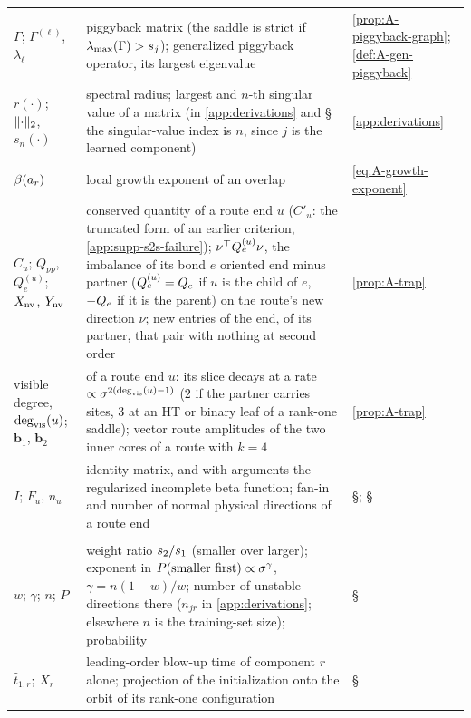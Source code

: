 \begin{xltabular}{\textwidth}{@{}>{\raggedright\arraybackslash}p{3.1cm}X
    >{\raggedright\arraybackslash}p{2.5cm}@{}}
  $\Gamma$; $\Gamma^{(\ell)}$, $\lambda_\ell$ & piggyback matrix (the saddle is strict if
    $\lambda_{\max}(\Gamma)>s_{j}$); generalized piggyback operator, its largest eigenvalue
    & \cref{prop:A-piggyback-graph}; \cref{def:A-gen-piggyback} \\
  $r(\cdot)$; $\lVert\cdot\rVert_2$, $s_n(\cdot)$ & spectral radius; largest and $n$-th singular value of a
    matrix (in \cref{app:derivations} and \S{} the singular-value index is
    $n$, since $j$ is the learned component) & \cref{app:derivations} \\
  $\beta(a_{r})$ & local growth exponent of an overlap & \eqref{eq:A-growth-exponent} \\
  $C_u$; $Q_{\nu\nu}$, $Q^{(u)}_e$; $X_{\rm nv}$, $Y_{\rm nv}$ & conserved quantity of a route end $u$
    ($C'_u$: the truncated form of an earlier criterion, \cref{app:supp-s2s-failure}); $\nu^{\top} Q^{(u)}_e\nu$, the
    imbalance of its bond $e$ oriented end minus partner
    ($Q^{(u)}_e=Q_{e}$ if $u$ is the child of $e$, $-Q_{e}$ if it is the parent) on the route's new direction
    $\nu$; new entries of the end, of its partner, that pair with nothing at second order
    & \cref{prop:A-trap} \\
  visible degree, $\deg_{\rm vis}(u)$; $\boldsymbol b_1$, $\boldsymbol b_2$ & of a route end $u$: its slice decays
    at a rate $\propto\sigma^{2(\deg_{\rm vis}(u)-1)}$ ($2$ if the partner carries sites, $3$ at an HT or binary
    leaf of a rank-one saddle); vector route amplitudes of the two inner cores of a route with $k=4$
    & \cref{prop:A-trap} \\
  $I$; $F_u$, $n_u$ & identity matrix, and with arguments the regularized incomplete beta function; fan-in and
    number of normal physical directions of a route end & \S{};
    \S{} \\
  \midrule
   \\
  $w$; $\gamma$; $n$; $P$ & weight ratio $s_{2}/s_{1}$ (smaller over larger); exponent in
    $P(\text{smaller first})\propto\sigma^{\gamma}$, $\gamma=n(1-w)/w$; number of unstable directions there
    ($n_{jr}$ in \cref{app:derivations}; elsewhere $n$ is the training-set size); probability
    & \S{} \\
  $\hat t_{1,r}$; $X_r$ & leading-order blow-up time of component $r$ alone; projection of the
    initialization onto the orbit of its rank-one configuration & \S{} \\

\end{xltabular}
